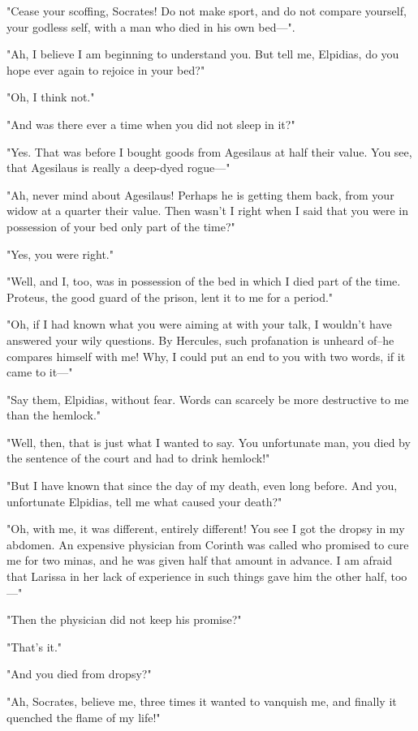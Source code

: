 "Cease your scoffing, Socrates! Do not make sport, and do not compare
yourself, your godless self, with a man who died in his own bed---".

"Ah, I believe I am beginning to understand you. But tell me,
Elpidias, do you hope ever again to rejoice in your bed?"

"Oh, I think not."

"And was there ever a time when you did not sleep in it?"

"Yes. That was before I bought goods from Agesilaus at half their
value. You see, that Agesilaus is really a deep-dyed rogue---"

"Ah, never mind about Agesilaus! Perhaps he is getting them back, from
your widow at a quarter their value. Then wasn't I right when I said
that you were in possession of your bed only part of the time?"

"Yes, you were right."

"Well, and I, too, was in possession of the bed in which I died part
of the time. Proteus, the good guard of the prison, lent it to me for
a period."

"Oh, if I had known what you were aiming at with your talk, I wouldn't
have answered your wily questions. By Hercules, such profanation is
unheard of--he compares himself with me! Why, I could put an end to
you with two words, if it came to it---"

"Say them, Elpidias, without fear. Words can scarcely be more
destructive to me than the hemlock."

"Well, then, that is just what I wanted to say. You unfortunate man,
you died by the sentence of the court and had to drink hemlock!"

"But I have known that since the day of my death, even long before.
And you, unfortunate Elpidias, tell me what caused your death?"

"Oh, with me, it was different, entirely different! You see I got the
dropsy in my abdomen. An expensive physician from Corinth was called
who promised to cure me for two minas, and he was given half that
amount in advance. I am afraid that Larissa in her lack of experience
in such things gave him the other half, too---"

"Then the physician did not keep his promise?"

"That's it."

"And you died from dropsy?"

"Ah, Socrates, believe me, three times it wanted to vanquish me, and
finally it quenched the flame of my life!"


